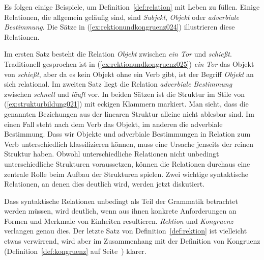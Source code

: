 
Es folgen einige Beispiele, um Definition~\ref{def:relation} mit Leben zu füllen.
Einige Relationen, die allgemein geläufig sind, sind \textit{Subjekt}, \textit{Objekt} oder \textit{adverbiale Bestimmung}.
Die Sätze in (\ref{ex:rektionundkongruenz024}) illustrieren diese Relationen.

\begin{exe}
  \ex\label{ex:rektionundkongruenz024}
  \begin{xlist}
  \end{xlist}
\end{exe}

Im ersten Satz besteht die Relation \textit{Objekt} zwischen \textit{ein Tor} und \textit{schießt}.
Traditionell gesprochen ist in (\ref{ex:rektionundkongruenz025}) \textit{ein Tor} das Objekt von \textit{schießt}, aber da es kein Objekt ohne ein Verb gibt, ist der Begriff \textit{Objekt} an sich relational.
Im zweiten Satz liegt die Relation \textit{adverbiale Bestimmung} zwischen \textit{schnell} und \textit{läuft} vor.
In beiden Sätzen ist die Struktur im Stile von (\ref{ex:strukturbildung021}) mit eckigen Klammern markiert.
Man sieht, dass die genannten Beziehungen aus der linearen Struktur alleine nicht ablesbar sind.
Im einen Fall steht nach dem Verb das Objekt, im anderen die adverbiale Bestimmung.
Dass wir Objekte und adverbiale Bestimmungen in Relation zum Verb unterschiedlich klassifizieren können, muss eine Ursache jenseits der reinen Struktur haben.
Obwohl unterschiedliche Relationen nicht unbedingt unterschiedliche Strukturen voraussetzen, können die Relationen durchaus eine zentrale Rolle beim Aufbau der Strukturen spielen.
Zwei wichtige syntaktische Relationen, an denen dies deutlich wird, werden jetzt diskutiert.

Dass syntaktische Relationen unbedingt als Teil der Grammatik betrachtet werden müssen, wird deutlich, wenn aus ihnen konkrete Anforderungen an Formen und Merkmale von Einheiten resultieren.
\textit{Rektion} und \textit{Kongruenz} verlangen genau dies.
Der letzte Satz von Definition~\ref{def:rektion} ist vielleicht etwas verwirrend, wird aber im Zusammenhang mit der Definition von Kongruenz (Definition~\ref{def:kongruenz} auf Seite~\pageref{def:kongruenz}) klarer.


